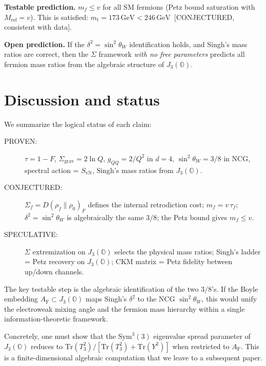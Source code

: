 \documentclass[prl,twocolumn,superscriptaddress,longbibliography]{revtex4-2}
\newcommand{\Tr}{\mathrm{Tr}}
\newcommand{\SvN}{S_{\mathrm{vN}}}
\newcommand{\AF}{A_{\mathrm{F}}}
\newcommand{\Mref}{M_{\mathrm{ref}}}
\newcommand{\JO}{J_3(\mathbb{O})}
\begin{document}
\medskip
\noindent\textbf{Testable prediction.}\;
$m_f \leq v$ for all SM fermions (Petz bound saturation
with $\Mref = v$). This is satisfied: $m_t = 173\,\mathrm{GeV}
< 246\,\mathrm{GeV}$~[CONJECTURED, consistent with data].

\medskip
\noindent\textbf{Open prediction.}\;
If the $\delta^2 = \sin^2\theta_W$ identification holds,
and Singh's mass ratios are correct, then the $\Sigma$
framework \emph{with no free parameters} predicts all
fermion mass ratios from the algebraic structure of
$\JO$.


\section{Discussion and status}
\label{sec:discussion}

We summarize the logical status of each claim:

\begin{description}
\item[PROVEN:]
  $\tau = 1-F$, $\Sigma_{\mathrm{grav}} = 2\ln Q$,
  $g_{QQ} = 2/Q^2$ in $d=4$,
  $\sin^2\theta_W = 3/8$ in NCG,
  spectral action = $\SvN$,
  Singh's mass ratios from $\JO$.

\item[CONJECTURED:]
  $\Sigma_f = D(\rho_f\|\rho_0)_F$ defines the
  internal retrodiction cost;
  $m_f = v\,\tau_f$;
  $\delta^2 = \sin^2\theta_W$ is algebraically the same
  $3/8$;
  the Petz bound gives $m_f \leq v$.

\item[SPECULATIVE:]
  $\Sigma$ extremization on $\JO$ selects the physical
  mass ratios;
  Singh's ladder = Petz recovery on $\JO$;
  CKM matrix = Petz fidelity between up/down channels.
\end{description}

The key testable step is the algebraic identification
of the two $3/8$'s.
If the Boyle embedding $\AF \subset \JO$
maps Singh's $\delta^2$ to the NCG $\sin^2\theta_W$,
this would unify the electroweak mixing angle and the
fermion mass hierarchy within a single
information-theoretic framework.

Concretely, one must show that the
$\mathrm{Sym}^3(3)$ eigenvalue spread parameter of
$\JO$ reduces to $\Tr(T_3^2)/[\Tr(T_3^2)+\Tr(Y^2)]$
when restricted to $\AF$.
This is a finite-dimensional algebraic computation
that we leave to a subsequent paper.
\end{document}

